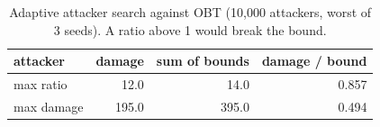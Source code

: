\begin{table}[t]
\centering
\small
\caption{Adaptive attacker search against OBT (10,000 attackers, worst of 3 seeds). A ratio above 1 would break the bound.}
\label{tab:e6}
\begin{tabular}{lrrr}
\toprule
attacker & damage & sum of bounds & damage / bound \\
\midrule
max ratio & 12.0 & 14.0 & 0.857 \\
max damage & 195.0 & 395.0 & 0.494 \\
\bottomrule
\end{tabular}
\end{table}
